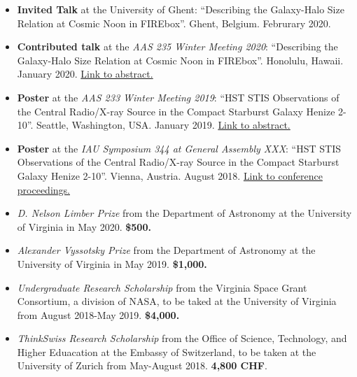 \documentclass[a4paper,10pt,oneside]{article}
\begin{document}
\begin{itemize}[wide, labelwidth=!, labelindent=-11pt, parsep=0pt]
    \item {\bf Invited Talk} at the University of Ghent: ``Describing the Galaxy-Halo Size Relation at Cosmic Noon in FIREbox''. Ghent, Belgium. Februrary 2020. 
    \item {\bf Contributed talk} at the {\it AAS 235 Winter Meeting 2020}: ``Describing the Galaxy-Halo Size Relation at Cosmic Noon in FIREbox''. Honolulu, Hawaii. January 2020. \href{https://ui.adsabs.harvard.edu/abs/2020AAS...23526001R/abstract}{Link to abstract.}
    \item {\bf Poster} at the {\it AAS 233 Winter Meeting 2019}: ``HST STIS Observations of the Central Radio/X-ray Source in the Compact Starburst Galaxy Henize 2-10''. Seattle, Washington, USA. January 2019. \href{https://ui.adsabs.harvard.edu/abs/2019AAS...23335119R/abstract}{Link to abstract.}
    \item {\bf Poster} at the {\it IAU Symposium 344 at General Assembly XXX}: ``HST STIS Observations of the Central Radio/X-ray Source in the Compact Starburst Galaxy Henize 2-10''. Vienna, Austria. August 2018. \href{https://doi.org/10.1017/S1743921318006282}{Link to conference proceedings.}
\end{itemize}


\noindent{}

\begin{itemize}[wide, labelwidth=!, labelindent=-11pt, parsep=0pt]
    \item {\it D. Nelson Limber Prize} from the Department of Astronomy at the University of Virginia in May 2020. {\bf \$500.}
    \item {\it Alexander Vyssotsky Prize} from the Department of Astronomy at the University of Virginia in May 2019. {\bf \$1,000.}
    \item {\it Undergraduate Research Scholarship} from the Virginia Space Grant Consortium, a division of NASA, to be taked at the University of Virginia from August 2018-May 2019. {\bf \$4,000.} 
    \item {\it ThinkSwiss Research Scholarship} from the Office of Science, Technology, and Higher Eduacation at the Embassy of Switzerland, to be taken at the University of Zurich from May-August 2018. {\bf 4,800 CHF}.
\end{itemize}

\noindent{}
\end{document}
